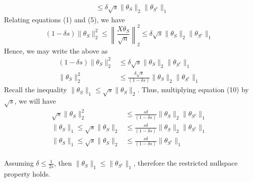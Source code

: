 \documentclass[10pt,handout,english]{beamer}
\begin{document}
\begin{frame}[allowframebreaks]
\begin{align}
&\leq\delta\sqrt{s}\lVert\theta_{S}\rVert_{2}\lVert\theta_{S^{c}}\rVert_{1}
\end{align}
\endgroup
Relating equations (1) and (5), we have 
\[
(1-\delta s)\lVert\theta_{S}\rVert_{2}^{2}\leq\left\lVert\frac{X\theta_{S}}{\sqrt{n}}\right\rVert_{2}^{2}\leq\delta\sqrt{s}\lVert\theta_{S}\rVert_{2}\lVert\theta_{S^{c}}\rVert_{1}
\]
Hence, we may write the above as
\begin{align}
(1-\delta s)\lVert\theta_{S}\rVert_{2}^{2}&\leq\delta\sqrt{s}\lVert\theta_{S}\rVert_{2}\lVert\theta_{S^{c}}\rVert_{1}\\
\lVert\theta_{S}\rVert_{2}^{2}&\leq\frac{\delta\sqrt{s}}{(1-\delta s)}\lVert\theta_{S}\rVert_{2}\lVert\theta_{S^{c}}\rVert_{1}
\end{align}
Recall the inequality $\lVert\theta_{S}\rVert_{1}\leq\sqrt{s}\lVert\theta_{S}\rVert_{2}$. Thus, multiplying equation (10) by $\sqrt{s}$, we will have
\begin{align*}
\sqrt{s}\lVert\theta_{S}\rVert_{2}^{2}&\leq\frac{s\delta}{(1-\delta s)}\lVert\theta_{S}\rVert_{2}\lVert\theta_{S^{c}}\rVert_{1}\\
\lVert\theta_{S}\rVert_{1}\leq\sqrt{s}\lVert\theta_{S}\rVert_{2}&\leq\frac{s\delta}{(1-\delta s)}\lVert\theta_{S}\rVert_{2}\lVert\theta_{S^{c}}\rVert_{1}\\
\lVert\theta_{S}\rVert_{1}\leq\sqrt{s}\lVert\theta_{S}\rVert_{2}&\leq\frac{s\delta}{(1-\delta s)}\lVert\theta_{S^{c}}\rVert_{1}\\
\end{align*}

Assuming $\delta\leq \frac{1}{2s}$, then $\lVert \theta_S\rVert_1\leq \lVert \theta_{S^c}\rVert_1$, therefore the restricted nullspace property holds. 

\end{frame}
\end{document}
